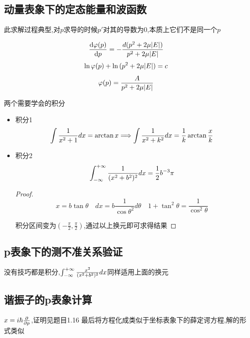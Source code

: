 \documentclass{article}
\begin{document}
        \subsection{动量表象下的定态能量和波函数}
            此求解过程典型,对$p$求导的时候$p'$对其的导数为$0$,本质上它们不是同一个$p$
            
            $$ \dv{\varphi(p)}{p} = - \frac{d(p^{2}+2\mu \abs{E})}{p^{2}+2\mu \abs{E}} $$
            $$ \ln{\varphi(p)}+\ln{(p^{2}+2\mu \abs{E})} = c                           $$
            $$ \varphi(p) = \frac{A}{p^{2}+2\mu \abs{E}}                               $$

            \begin{formal}
                
                两个需要学会的积分
                \begin{itemize}
                    \item 积分1
                        $$\int \frac{1}{x^{2}+1} dx  = \arctan{x} \Longrightarrow \int \frac{1}{x^{2}+k^{2}} dx = \frac{1}{k} \arctan{\frac{x}{k}} $$
                    \item 积分2
                        $$ \int_{-\infty}^{+\infty} \frac{1}{(x^{2}+b^{2})^{2}} dx = \frac{1}{2} b^{-3} \pi $$
    
                    \begin{proof}
                        \pfindent
                        $$ x = b\tan{\theta} \quad dx = b \frac{1}{\cos{\theta}^{2}} d\theta \quad 1+\tan^{2}{\theta} = \frac{1}{\cos^{2}{\theta}} $$

                        积分区间变为$ (-\frac{\pi}{2},\frac{\pi}{2}) $,通过以上换元即可求得结果
                    \end{proof}

                \end{itemize}
            \end{formal}
            
        \subsection{p表象下的测不准关系验证}
            没有技巧都是积分,$\int_{-\infty}^{+\infty} \frac{x^{2}}{(x^{2}+b^{2})^{2}} dx $同样适用上面的换元        

        \subsection{谐振子的p表象计算}
            $ x = i\hbar \pdv{p}$,证明见题目1.16
            最后将方程化成类似于坐标表象下的薛定谔方程,解的形式类似
\end{document}
